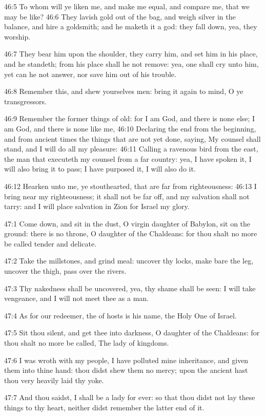 46:5 To whom will ye liken me, and make me equal, and compare me, that
we may be like?  46:6 They lavish gold out of the bag, and weigh
silver in the balance, and hire a goldsmith; and he maketh it a god:
they fall down, yea, they worship.

46:7 They bear him upon the shoulder, they carry him, and set him in
his place, and he standeth; from his place shall he not remove: yea,
one shall cry unto him, yet can he not answer, nor save him out of his
trouble.

46:8 Remember this, and shew yourselves men: bring it again to mind, O
ye transgressors.

46:9 Remember the former things of old: for I am God, and there is
none else; I am God, and there is none like me, 46:10 Declaring the
end from the beginning, and from ancient times the things that are not
yet done, saying, My counsel shall stand, and I will do all my
pleasure: 46:11 Calling a ravenous bird from the east, the man that
executeth my counsel from a far country: yea, I have spoken it, I will
also bring it to pass; I have purposed it, I will also do it.

46:12 Hearken unto me, ye stouthearted, that are far from
righteousness: 46:13 I bring near my righteousness; it shall not be
far off, and my salvation shall not tarry: and I will place salvation
in Zion for Israel my glory.

47:1 Come down, and sit in the dust, O virgin daughter of Babylon, sit
on the ground: there is no throne, O daughter of the Chaldeans: for
thou shalt no more be called tender and delicate.

47:2 Take the millstones, and grind meal: uncover thy locks, make bare
the leg, uncover the thigh, pass over the rivers.

47:3 Thy nakedness shall be uncovered, yea, thy shame shall be seen: I
will take vengeance, and I will not meet thee as a man.

47:4 As for our redeemer, the \LORD of hosts is his name, the Holy One
of Israel.

47:5 Sit thou silent, and get thee into darkness, O daughter of the
Chaldeans: for thou shalt no more be called, The lady of kingdoms.

47:6 I was wroth with my people, I have polluted mine inheritance, and
given them into thine hand: thou didst shew them no mercy; upon the
ancient hast thou very heavily laid thy yoke.

47:7 And thou saidst, I shall be a lady for ever: so that thou didst
not lay these things to thy heart, neither didst remember the latter
end of it.

